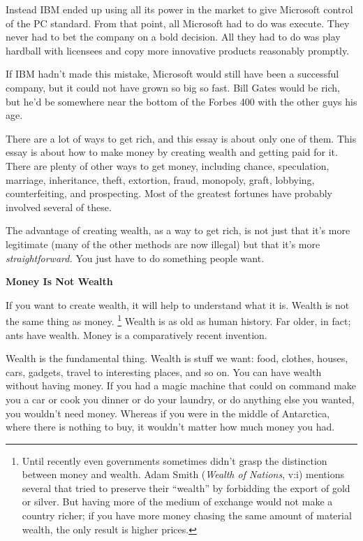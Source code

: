 \documentclass[12pt]{book}
\begin{document}
Instead IBM ended up using all its power in the market to give Microsoft
control of the PC standard. From that point, all Microsoft had to do was
execute. They never had to bet the company on a bold decision. All they
had to do was play hardball with licensees and copy more innovative
products reasonably promptly.

If IBM hadn't made this mistake, Microsoft would still have been a
successful company, but it could not have grown so big so fast. Bill
Gates would be rich, but he'd be somewhere near the bottom of the Forbes
400 with the other guys his age.

There are a lot of ways to get rich, and this essay is about only one of
them. This essay is about how to make money by creating wealth and
getting paid for it. There are plenty of other ways to get money,
including chance, speculation, marriage, inheritance, theft, extortion,
fraud, monopoly, graft, lobbying, counterfeiting, and prospecting. Most
of the greatest fortunes have probably involved several of these.

The advantage of creating wealth, as a way to get rich, is not just that
it's more legitimate (many of the other methods are now illegal) but
that it's more \emph{straightforward.} You just have to do something
people want.

\textbf{Money Is Not Wealth}

If you want to create wealth, it will help to understand what it is.
Wealth is not the same thing as money. \footnote{Until recently even governments sometimes didn't grasp the
distinction between money and wealth. Adam Smith (\emph{Wealth of
Nations}, v:i) mentions several that tried to preserve their ``wealth''
by forbidding the export of gold or silver. But having more of the
medium of exchange would not make a country richer; if you have more
money chasing the same amount of material wealth, the only result is
higher prices.} Wealth is
as old as human history. Far older, in fact; ants have wealth. Money is
a comparatively recent invention.

Wealth is the fundamental thing. Wealth is stuff we want: food, clothes,
houses, cars, gadgets, travel to interesting places, and so on. You can
have wealth without having money. If you had a magic machine that could
on command make you a car or cook you dinner or do your laundry, or do
anything else you wanted, you wouldn't need money. Whereas if you were
in the middle of Antarctica, where there is nothing to buy, it wouldn't
matter how much money you had.
\end{document}
